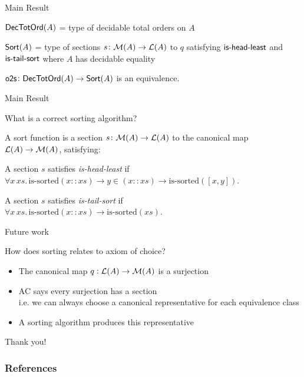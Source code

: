 \documentclass[9pt]{beamer}
\begin{document}
\begin{frame}{Main Result}

\begin{dblock}
    $\mathsf{DecTotOrd}(A)$ = type of decidable total orders on $A$

    $\mathsf{Sort}(A)$ = type of sections $s\colon \mathcal{M}(A) \to \mathcal{L}(A)$ to $q$
    satisfying $\operatorname{\mathsf{is-head-least}}$ and $\operatorname{\mathsf{is-tail-sort}}$
    where $A$ has decidable equality
\end{dblock}

\begin{tblock}
    $\operatorname{\mathsf{o2s}}\colon \mathsf{DecTotOrd}(A) \to \mathsf{Sort}(A)$ is an equivalence.
\end{tblock}

\end{frame}

\begin{frame}{Main Result}

  \begin{qblock}
    What is a correct sorting algorithm?
  \end{qblock}

  A sort function is a section $s\colon \mathcal{M}(A) \to \mathcal{L}(A)$ to the canonical map $\mathcal{L}(A) \to \mathcal{M}(A)$,
  satisfying:

\begin{dblock}
    A section $s$ satisfies \textit{is-head-least} if \\
    $\forall x \, xs. \, \text{is-sorted}(x :: xs) \to y \in (x :: xs) \to \text{is-sorted}([x, y])$.
\end{dblock}

\begin{dblock}
    A section $s$ satisfies \textit{is-tail-sort} if \\
    $\forall x \, xs. \, \text{is-sorted}(x :: xs) \to \text{is-sorted}(xs)$.
\end{dblock}


\end{frame}

\begin{frame}{Future work}

How does sorting relates to \alert{axiom of choice}?

\begin{itemize}
    \item The canonical map $q : \mathcal{L}(A) \to \mathcal{M}(A)$ is a surjection
    \item AC says every surjection has a section \\
    i.e. we can always choose a canonical representative for each equivalence class
    \item A sorting algorithm produces this representative
\end{itemize}

\end{frame}

\begin{frame}[standout]
    Thank you!
\end{frame}


\begin{frame}[allowframebreaks]
    \frametitle{References}
    \printbibliography[heading=none]
\end{frame}
\end{document}
